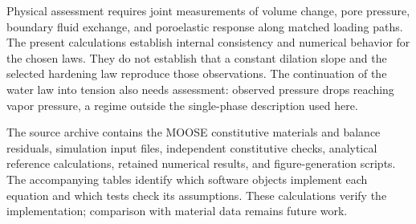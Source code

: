 Physical assessment requires joint measurements of volume change, pore
pressure, boundary fluid exchange, and poroelastic response along matched
loading paths. The present calculations establish internal consistency and
numerical behavior for the chosen laws. They do not establish that a constant
dilation slope and the selected hardening law reproduce those observations.
The continuation of the water law into tension also needs assessment:
\citet{brantut2020} observed pressure drops reaching vapor pressure, a regime
outside the single-phase description used here.

The source archive contains the MOOSE constitutive materials and balance
residuals, simulation input files, independent constitutive checks,
analytical reference calculations, retained numerical results, and
figure-generation scripts.  The accompanying tables identify which software
objects implement each equation and which tests check its assumptions.
These calculations verify the implementation; comparison with material data
remains future work.
